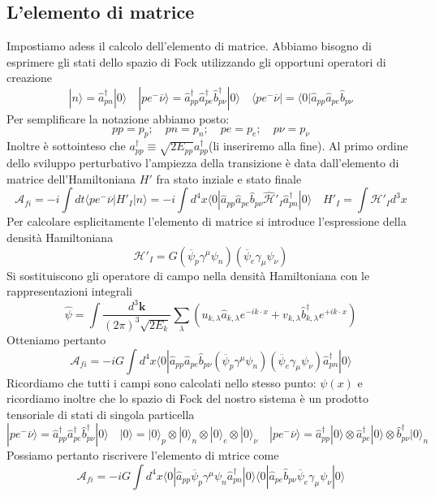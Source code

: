 \subsection{L'elemento di matrice}
Impostiamo adess il calcolo dell'elemento di matrice. Abbiamo bisogno di esprimere gli stati dello spazio di Fock utilizzando gli opportuni operatori di creazione 
$$ 
|n\rangle = \hat{a}_{pn}^\dagger |0\rangle \quad |pe^-\overline{\nu}\rangle = \hat{a}_{pp}^\dagger \hat{a}_{pe}^\dagger \hat{b}_{p\nu}^\dagger |0\rangle \quad \langle pe^-\overline{\nu}| = \langle 0 | \hat{a}_{pp} \hat{a}_{pe} \hat{b}_{p\nu}
$$
Per semplificare la notazione abbiamo posto:
$$
pp=p_p; \quad pn=p_n; \quad pe=p_e; \quad p\nu=p_\nu
$$
Inoltre è sottointeso che $a_{pp}^\dagger \equiv \sqrt{2E_{pp}} a_{pp}^\dagger $(li inseriremo alla fine). Al primo ordine dello sviluppo perturbativo l'ampiezza della transizione è data dall'elemento di matrice dell'Hamiltoniana $H'$ fra stato inziale e stato finale
$$
\mathcal{A}_{fi} = -i \int dt \langle pe^-\overline{\nu} | H'_I | n \rangle = -i \int d^4x \langle 0 | \hat{a}_{pp} \hat{a}_{pe} \hat{b}_{p\nu} \hat{\mathcal{H}}'_I \hat{a}_{pn}^\dagger |0\rangle \quad H'_I = \int \mathcal{H}'_I d^3x
$$
Per calcolare esplicitamente l'elemento di matrice si introduce l'espressione della densità Hamiltoniana
$$
\mathcal{H}'_I = G (\overline{\psi}_p \gamma^\mu \psi_n) (\overline{\psi}_e \gamma_\mu \psi_\nu)
$$
Si sostituiscono gli operatore di campo nella densità Hamiltoniana con le rappresentazioni integrali
$$
\hat{\psi} = \int \frac{d^3\mathbf{k}}{(2\pi)^3 \sqrt{2E_k}} \sum_\lambda (u_{k,\lambda} \hat{a}_{k,\lambda} e^{-ik\cdot x} + v_{k,\lambda} \hat{b}_{k,\lambda}^\dagger e^{+ik\cdot x})
$$
Otteniamo pertanto
$$
\mathcal{A}_{fi} = -iG \int d^4x \langle 0 | \hat{a}_{pp} \hat{a}_{pe} \hat{b}_{p\nu} (\overline{\psi}_p \gamma^\mu \psi_n) (\overline{\psi}_e \gamma_\mu \psi_\nu) \hat{a}_{pn}^\dagger |0\rangle
$$
Ricordiamo che tutti i campi sono calcolati nello stesso punto: $\psi(x)$ e ricordiamo inoltre che lo spazio di Fock del nostro sistema è un prodotto tensoriale di stati di singola particella
$$
|pe^-\overline{\nu}\rangle = \hat{a}_{pp}^\dagger \hat{a}_{pe}^\dagger \hat{b}_{p\nu}^\dagger |0\rangle \quad |0\rangle = |0\rangle_p \otimes |0\rangle_n \otimes |0\rangle_e \otimes |0\rangle_\nu \quad |pe^-\overline{\nu}\rangle = \hat{a}_{pp}^\dagger |0\rangle \otimes \hat{a}_{pe}^\dagger |0\rangle \otimes \hat{b}_{p\nu}^\dagger |0\rangle_n
$$
Possiamo pertanto riscrivere l'elemento di mtrice come
$$
\mathcal{A}_{fi} = -iG \int d^4x \langle 0 | \hat{a}_{pp} \overline{\psi}_p \gamma^\mu \psi_n \hat{a}_{pn}^\dagger |0\rangle \langle 0 | \hat{a}_{pe} \hat{b}_{p\nu} \overline{\psi}_e \gamma_\mu \psi_\nu |0\rangle
$$
